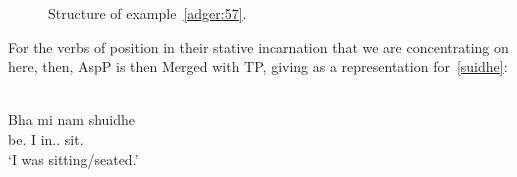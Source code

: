 \documentclass[output=paper]{langsci/langscibook}
\begin{document}
\begin{figure}
    \caption{Structure of example~\eqref{adger:57}.\label{ag-tree2}}
\end{figure}

For the verbs of position in their stative incarnation that we are
concentrating on here, then, AspP is then Merged with TP,
giving  as a representation for~\eqref{suidhe}:

\ea {} \label{suidhe}\\
 \gll  Bha mi nam shuidhe\\
be.\Pst{} I in.\Poss.\Fsg{} sit.\Vn{}\\
\glt \enquote*{I was sitting/seated.}
\z
\end{document}
